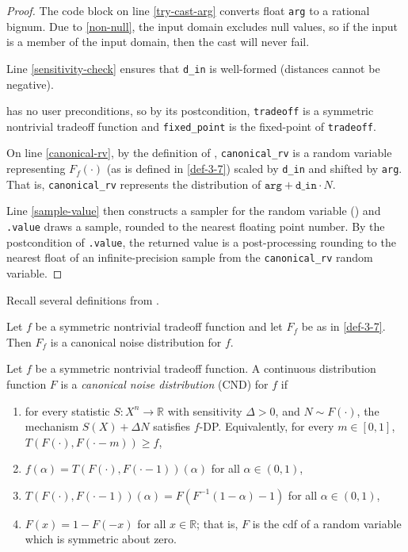 \documentclass{article}
\begin{document}
\begin{proof}
The code block on line \ref{try-cast-arg} converts float \texttt{arg} to a rational bignum.
Due to \ref{non-null}, the input domain excludes null values, 
so if the input is a member of the input domain, then the cast will never fail.

Line \ref{sensitivity-check} ensures that \texttt{d\_in} is well-formed (distances cannot be negative).
    
 has no user preconditions,
so by its postcondition, \texttt{tradeoff} is a symmetric nontrivial tradeoff function
and \texttt{fixed\_point} is the fixed-point of \texttt{tradeoff}.

On line \ref{canonical-rv}, by the definition of ,
\texttt{canonical\_rv} is a random variable representing $F_f(\cdot)$ (as is defined in \ref{def-3-7}) 
scaled by \texttt{d\_in} and shifted by \texttt{arg}.
That is, \texttt{canonical\_rv} represents the distribution of $\texttt{arg} + \texttt{d\_in} \cdot N$.

Line \ref{sample-value} then constructs a sampler for the random variable ()
and \texttt{.value} draws a sample, rounded to the nearest floating point number.
By the postcondition of \texttt{.value}, 
the returned value is a post-processing rounding to the nearest float
of an infinite-precision sample from the \texttt{canonical\_rv} random variable.
\end{proof}

Recall several definitions from \cite{awan2023canonical}.
\begin{theorem}
    \label{thm-3-9}
    Let $f$ be a symmetric nontrivial tradeoff function and let $F_f$ be as in
        \ref{def-3-7}. Then $F_f$ is a canonical noise distribution for $f$.
\end{theorem}

\begin{definition}
    \label{def-3-1}    
    Let $f$ be a symmetric nontrivial tradeoff function. A {continuous} distribution function $F$ is a \emph{canonical noise distribution} (CND) for $f$ if 
    \begin{enumerate}[(1)]
        \item for every statistic $S: X^n\rightarrow \mathbb{R}$ with sensitivity $\Delta>0$, and $N\sim F(\cdot)$, 
            the mechanism $S(X) + \Delta N$ satisfies $f$-DP. Equivalently, for every $m\in [0,1]$, $T(F(\cdot),F(\cdot-m))\geq f$,
        \item $f(\alpha)=T(F(\cdot),F(\cdot-1))(\alpha)$ for all $\alpha \in (0,1)$,
        \item $T(F(\cdot),F(\cdot-1))(\alpha) = F(F^{-1}(1-\alpha)-1)$ for all $\alpha \in (0,1)$,
        \item $F(x) = 1-F(-x)$ for all $x\in \mathbb{R}$; that is, $F$ is the cdf of a random variable which is symmetric about zero.
    \end{enumerate}
\end{definition}
\end{document}
